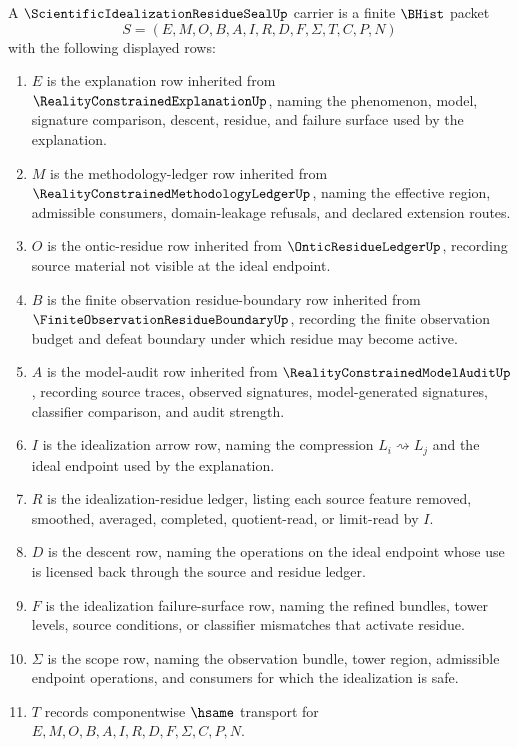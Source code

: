 \begin{definition}
\label{def:scientific-idealization-residue-seal-carrier}
A $\ScientificIdealizationResidueSealUp$ carrier is a finite $\BHist$ packet
$$
S=(E,M,O,B,A,I,R,D,F,\Sigma,T,C,P,N)
$$
with the following displayed rows:
\begin{enumerate}
\item $E$ is the explanation row inherited from $\RealityConstrainedExplanationUp$, naming the phenomenon, model, signature comparison, descent, residue, and failure surface used by the explanation.
\item $M$ is the methodology-ledger row inherited from $\RealityConstrainedMethodologyLedgerUp$, naming the effective region, admissible consumers, domain-leakage refusals, and declared extension routes.
\item $O$ is the ontic-residue row inherited from $\OnticResidueLedgerUp$, recording source material not visible at the ideal endpoint.
\item $B$ is the finite observation residue-boundary row inherited from $\FiniteObservationResidueBoundaryUp$, recording the finite observation budget and defeat boundary under which residue may become active.
\item $A$ is the model-audit row inherited from $\RealityConstrainedModelAuditUp$, recording source traces, observed signatures, model-generated signatures, classifier comparison, and audit strength.
\item $I$ is the idealization arrow row, naming the compression $L_i\rightsquigarrow L_j$ and the ideal endpoint used by the explanation.
\item $R$ is the idealization-residue ledger, listing each source feature removed, smoothed, averaged, completed, quotient-read, or limit-read by $I$.
\item $D$ is the descent row, naming the operations on the ideal endpoint whose use is licensed back through the source and residue ledger.
\item $F$ is the idealization failure-surface row, naming the refined bundles, tower levels, source conditions, or classifier mismatches that activate residue.
\item $\Sigma$ is the scope row, naming the observation bundle, tower region, admissible endpoint operations, and consumers for which the idealization is safe.
\item $T$ records componentwise $\hsame$ transport for $E,M,O,B,A,I,R,D,F,\Sigma,C,P,N$.

\end{enumerate}
\end{definition}
